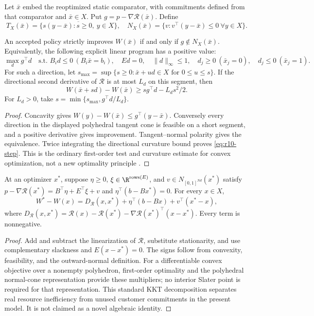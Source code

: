 Let $\bar x$ embed the reoptimized static comparator, with commitments defined from that comparator and $\bar x\in X$. Put $g=p-\nabla\mathcal R(\bar x)$. Define
\[
 T_X(\bar x)=\overline{\{s(y-\bar x):s\geq0,\ y\in X\}},\quad
 N_X(\bar x)=\{v:v^\top(y-\bar x)\leq0\ \forall y\in X\}.
\]
\begin{lemma}\label{lem:r10-alternative}
An accepted policy strictly improves $W(\bar x)$ if and only if $g\notin N_X(\bar x)$. Equivalently, the following explicit linear program has a positive value:
\[
 \max_d g^\top d\quad\text{s.t. } B_i d\leq0\ (B_i\bar x=b_i),\quad Ed=0,\quad
 \|d\|_\infty\leq1,\quad
 d_j\geq0\ (\bar x_j=0),\quad d_j\leq0\ (\bar x_j=1).
\]
For such a direction, let $s_{\max}=\sup\{s\geq0:\bar x+ud\in X\text{ for }0\leq u\leq s\}$. If the directional second derivative of $\mathcal R$ is at most $L_d$ on this segment, then
\begin{equation}\label{eq:r10-step}
 W(\bar x+sd)-W(\bar x)\geq s g^\top d-L_ds^2/2.
\end{equation}
For $L_d>0$, take $s=\min\{s_{\max},g^\top d/L_d\}$.
\end{lemma}
\begin{proof}
Concavity gives $W(y)-W(\bar x)\leq g^\top(y-\bar x)$. Conversely every direction in the displayed polyhedral tangent cone is feasible on a short segment, and a positive derivative gives improvement. Tangent--normal polarity gives the equivalence. Twice integrating the directional curvature bound proves \eqref{eq:r10-step}. This is the ordinary first-order test and curvature estimate for convex optimization, not a new optimality principle \citep{BoydVandenberghe2004}.
\end{proof}

\begin{lemma}\label{lem:r10-bregman}
At an optimizer $x^*$, suppose $\eta\geq0$, $\xi\in\R^{\mathrm{rows}(E)}$, and $v\in N_{[0,1]^{Nd}}(x^*)$ satisfy
$p-\nabla\mathcal R(x^*)=B^\top\eta+E^\top\xi+v$ and $\eta^\top(b-Bx^*)=0$. For every $x\in X$,
\[
 W^*-W(x)=D_{\mathcal R}(x,x^*)+\eta^\top(b-Bx)+v^\top(x^*-x),
\]
where $D_{\mathcal R}(x,x^*)=\mathcal R(x)-\mathcal R(x^*)-\nabla\mathcal R(x^*)^\top(x-x^*)$. Every term is nonnegative.
\end{lemma}
\begin{proof}
Add and subtract the linearization of $\mathcal R$, substitute stationarity, and use complementary slackness and $E(x-x^*)=0$. The signs follow from convexity, feasibility, and the outward-normal definition. For a differentiable convex objective over a nonempty polyhedron, first-order optimality and the polyhedral normal-cone representation provide these multipliers; no interior Slater point is required for that representation. This standard KKT decomposition \citep{BoydVandenberghe2004} separates real resource inefficiency from unused customer commitments in the present model. It is not claimed as a novel algebraic identity.
\end{proof}
